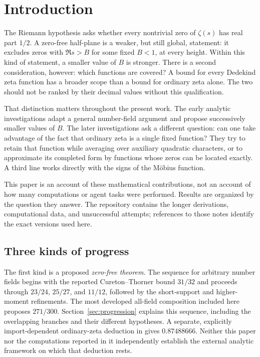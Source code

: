 \section{Introduction}\label{sec:introduction}

The Riemann hypothesis asks whether every nontrivial zero of $\zeta(s)$ has real part $1/2$. A zero-free half-plane is a weaker, but still global, statement: it excludes zeros with $\Re s>B$ for some fixed $B<1$, at every height. Within this kind of statement, a smaller value of $B$ is stronger. There is a second consideration, however: which functions are covered? A bound for every Dedekind zeta function has a broader scope than a bound for ordinary zeta alone. The two should not be ranked by their decimal values without this qualification.

That distinction matters throughout the present work. The early analytic investigations adapt a general number-field argument and propose successively smaller values of $B$. The later investigations ask a different question: can one take advantage of the fact that ordinary zeta is a single fixed function? They try to retain that function while averaging over auxiliary quadratic characters, or to approximate its completed form by functions whose zeros can be located exactly. A third line works directly with the signs of the M\"obius function.

This paper is an account of these mathematical contributions, not an account of how many computations or agent tasks were performed. Results are organized by the question they answer. The repository contains the longer derivations, computational data, and unsuccessful attempts; references to those notes identify the exact versions used here.

\subsection{Three kinds of progress}

The first kind is a proposed \emph{zero-free theorem}. The sequence for arbitrary number fields begins with the reported Cureton--Thorner bound $31/32$ and proceeds through $23/24$, $25/27$, and $11/12$, followed by the short-support and higher-moment refinements. The most developed all-field composition included here proposes $271/300$. Section~\ref{sec:progression} explains this sequence, including the overlapping branches and their different hypotheses. A separate, explicitly import-dependent ordinary-zeta deduction in \cite{R1005} gives $0.87488666$. Neither this paper nor the computations reported in it independently establish the external analytic framework on which that deduction rests.

